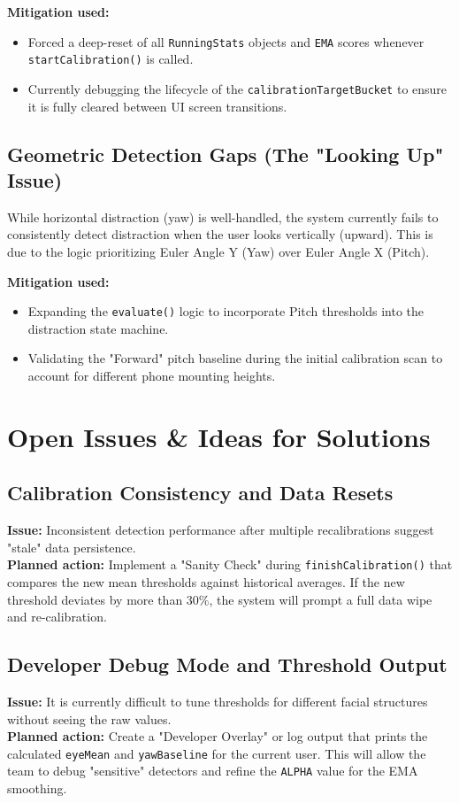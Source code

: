 \documentclass[11pt]{report}
\begin{document}
\textbf{Mitigation used:}
\begin{itemize}
    \item Forced a deep-reset of all \texttt{RunningStats} objects and \texttt{EMA} scores whenever \texttt{startCalibration()} is called.
    \item Currently debugging the lifecycle of the \texttt{calibrationTargetBucket} to ensure it is fully cleared between UI screen transitions.
\end{itemize}

\subsection{Geometric Detection Gaps (The "Looking Up" Issue)}
While horizontal distraction (yaw) is well-handled, the system currently fails to consistently detect distraction when the user looks vertically (upward). This is due to the logic prioritizing Euler Angle Y (Yaw) over Euler Angle X (Pitch).

\textbf{Mitigation used:}
\begin{itemize}
    \item Expanding the \texttt{evaluate()} logic to incorporate Pitch thresholds into the distraction state machine.
    \item Validating the "Forward" pitch baseline during the initial calibration scan to account for different phone mounting heights.
\end{itemize}

\section{Open Issues \& Ideas for Solutions}

\subsection{Calibration Consistency and Data Resets}
\textbf{Issue:} Inconsistent detection performance after multiple recalibrations suggest "stale" data persistence.\\
\textbf{Planned action:} Implement a "Sanity Check" during \texttt{finishCalibration()} that compares the new mean thresholds against historical averages. If the new threshold deviates by more than $30\%$, the system will prompt a full data wipe and re-calibration.

\subsection{Developer Debug Mode and Threshold Output}
\textbf{Issue:} It is currently difficult to tune thresholds for different facial structures without seeing the raw values.\\
\textbf{Planned action:} Create a "Developer Overlay" or log output that prints the calculated \texttt{eyeMean} and \texttt{yawBaseline} for the current user. This will allow the team to debug "sensitive" detectors and refine the \texttt{ALPHA} value for the EMA smoothing.
\end{document}
